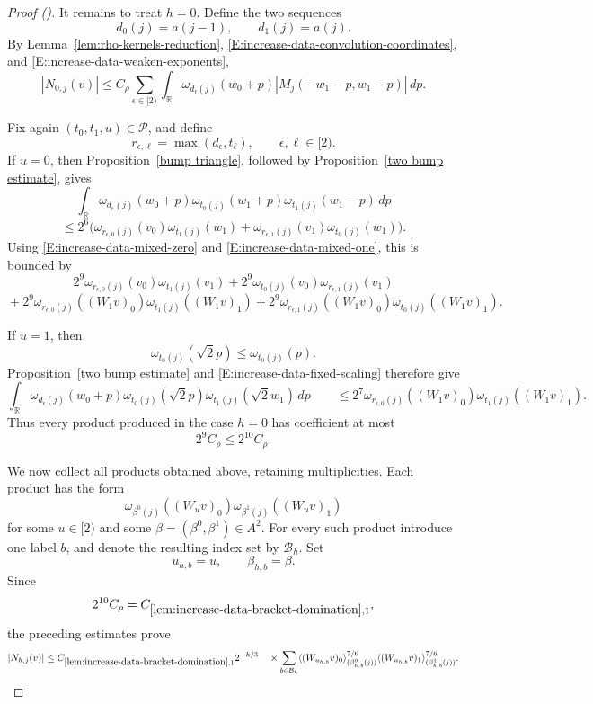 \documentclass[12pt,reqno]{amsart}
\newcommand{\auto}{{({\tiny\faCar})}}
\theoremstyle{plain}
\numberwithin{equation}{section}
\theoremstyle{remark}
\begin{document}
\begin{proof}[Proof \auto]
It remains to treat \(h=0\). Define the two sequences
\[
d_0(j)=a(j-1),
\qquad
d_1(j)=a(j).
\]
By Lemma~\ref{lem:rho-kernels-reduction},
\eqref{E:increase-data-convolution-coordinates}, and
\eqref{E:increase-data-weaken-exponents},
\begin{equation}
    \label{E:increase-data-h-zero-initial}
    |N_{0,j}(v)| \leq C_\rho \sum_{\epsilon\in[2)} \int_{\mathbb R} \omega_{d_\epsilon(j)}(w_0+p) |M_j(-w_1-p,w_1-p)|\,dp.
\end{equation}

Fix again \((t_0,t_1,u)\in\mathcal P\), and define
\[
r_{\epsilon,\ell}
=
\max(d_\epsilon,t_\ell),
\qquad
\epsilon,\ell\in[2).
\]
If \(u=0\), then Proposition~\ref{bump triangle}, followed by
Proposition~\ref{two bump estimate}, gives
\[
\int_{\mathbb R}
\omega_{d_\epsilon(j)}(w_0+p)
\omega_{t_0(j)}(w_1+p)
\omega_{t_1(j)}(w_1-p)\,dp
\]
\[
{}\leq
2^6\Big(
\omega_{r_{\epsilon,0}(j)}(v_0)
\omega_{t_1(j)}(w_1)
+
\omega_{r_{\epsilon,1}(j)}(v_1)
\omega_{t_0(j)}(w_1)
\Big).
\]
Using
\eqref{E:increase-data-mixed-zero} and
\eqref{E:increase-data-mixed-one}, this is bounded by
\begin{equation}
    \label{E:increase-data-h0-u0}
2^9\omega_{r_{\epsilon,0}(j)}(v_0)
\omega_{t_1(j)}(v_1)
+2^9\omega_{t_0(j)}(v_0)
\omega_{r_{\epsilon,1}(j)}(v_1)
\end{equation}
\[
{}+2^9\omega_{r_{\epsilon,0}(j)}((W_1v)_0)
\omega_{t_1(j)}((W_1v)_1)
+2^9\omega_{r_{\epsilon,1}(j)}((W_1v)_0)
\omega_{t_0(j)}((W_1v)_1).
\]

If \(u=1\), then
\[
\omega_{t_0(j)}(\sqrt2p)
\leq
\omega_{t_0(j)}(p).
\]
Proposition~\ref{two bump estimate} and
\eqref{E:increase-data-fixed-scaling} therefore give
\begin{equation}
    \label{E:increase-data-h0-u1}
    \int_{\mathbb R} \omega_{d_\epsilon(j)}(w_0+p) \omega_{t_0(j)}(\sqrt2p) \omega_{t_1(j)}(\sqrt2w_1)\,dp \qquad\leq 2^7 \omega_{r_{\epsilon,0}(j)}((W_1v)_0) \omega_{t_1(j)}((W_1v)_1).
\end{equation}
Thus every product produced in the case \(h=0\) has coefficient at
most
\[
2^9C_\rho
\leq
2^{10}C_\rho.
\]

We now collect all products obtained above, retaining
multiplicities. Each product has the form
\[
\omega_{\beta^0(j)}((W_uv)_0)
\omega_{\beta^1(j)}((W_uv)_1)
\]
for some \(u\in[2)\) and some
\(\beta=(\beta^0,\beta^1)\in A^2\).
For every such product introduce one label \(b\), and denote the
resulting index set by \(\mathcal B_h\). Set
\[
u_{h,b}=u,
\qquad
\beta_{h,b}=\beta.
\]
Since
\[
2^{10}C_\rho
=
C_{\ref{lem:increase-data-bracket-domination},1},
\]
the preceding estimates prove
\[
|N_{h,j}(v)| \leq C_{\ref{lem:increase-data-bracket-domination},1} 2^{-h/3} \quad\times \sum_{b\in\mathcal B_h} \langle(W_{u_{h,b}}v)_0 \rangle_{(\beta_{h,b}^0(j))}^{7/6} \langle(W_{u_{h,b}}v)_1 \rangle_{(\beta_{h,b}^1(j))}^{7/6}.
\]


\end{proof}
\end{document}
